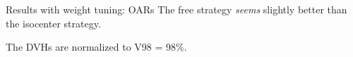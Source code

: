 \begin{frame}[c]{Results with weight tuning: OARs}
	The free strategy \textit{seems} slightly better than the isocenter strategy.
	\begin{figure}
	\end{figure}
	The DVHs are normalized to V98 = 98\%.
\end{frame}


